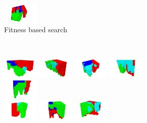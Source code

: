 \begin{figure}[t!]
\begin{subfigure}[b]{1.0\textwidth}
\includegraphics[width=0.19\textwidth]{../Figures/Robots/f_4_g_1000.jpg}
\caption{Fitness based search}
\end{subfigure}\\
\begin{subfigure}[b]{1.0\textwidth}
\includegraphics[width=0.19\textwidth]{../Figures/Robots/n_4_g_100.jpg}
\includegraphics[width=0.19\textwidth]{../Figures/Robots/n_4_g_200.jpg}
\includegraphics[width=0.19\textwidth]{../Figures/Robots/n_4_g_300.jpg}
\includegraphics[width=0.19\textwidth]{../Figures/Robots/n_4_g_400.jpg}
\includegraphics[width=0.19\textwidth]{../Figures/Robots/n_4_g_500.jpg}\\
\includegraphics[width=0.19\textwidth]{../Figures/Robots/n_4_g_600.jpg}
\includegraphics[width=0.19\textwidth]{../Figures/Robots/n_4_g_700.jpg}
\includegraphics[width=0.19\textwidth]{../Figures/Robots/n_4_g_800.jpg}

\end{subfigure}
\end{figure}
